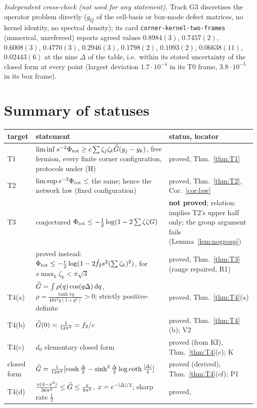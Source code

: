 \documentclass[11pt]{article}
\theoremstyle{definition}\newtheorem{hypothesis}[theorem]{Hypothesis}
\begin{document}
\emph{Independent cross-check (not used for any statement).}  Track G3 discretises the operator problem
directly ($g_Q$ of the cell-basis or box-mode defect matrices, no kernel identity, no spectral density); its
card \texttt{corner-kernel-two-frames} (numerical, unrefereed) reports agreed values $0.8984(3)$, $0.7457(2)$,
$0.6008(3)$, $0.4770(3)$, $0.2946(3)$, $0.1798(2)$, $0.1093(2)$, $0.06638(11)$, $0.02443(6)$ at the nine
$\Delta$ of the table, i.e.\ within its stated uncertainty of the closed form at every point (largest
deviation $1.7\cdot10^{-4}$ in its T0 frame, $3.8\cdot10^{-5}$ in its box frame).

\section{Summary of statuses}\label{sec:summary}
\begin{center}\small
\begin{tabular}{p{}p{}p{}}\toprule
target & statement & status, locator\\\midrule
T1 & $\liminf s^{-2}\Phi_{\rm tot}\ge c\sum\zeta_j\zeta_k\widehat G(y_j-y_k)$, free fermion, every finite corner
 configuration, protocols under (H) & proved, Thm.~\ref{thm:T1}\\
T2 & $\limsup s^{-2}\Phi_{\rm tot}\le$ the same; hence the network law (fixed configuration) & proved,
 Thm.~\ref{thm:T2}, Cor.~\ref{cor:law}\\
T3 & conjectured $\Phi_{\rm tot}\le-\frac12\log(1-2\sum\zeta\zeta G)$ & \textbf{not proved}; relation:
 implies T2's upper half only; the group argument fails (Lemma~\ref{lem:nogroup})\\
 & proved instead: $\Phi_{\rm tot}\le-\frac r2\log(1-2\hat f_2s^2(\sum\zeta_k)^2)$, for $s\max_k\zeta_k<\pi\sqrt3$ &
 proved, Thm.~\ref{thm:T3} (range repaired, R1)\\
T4(a) & $\widehat G=\int\rho(q)\cos(q\Delta)\,\mathrm d q$, $\rho=\frac{\tanh\pi q}{48\pi^2q(1+q^2)}>0$; strictly positive-definite &
 proved, Thm.~\ref{thm:T4}(a)\\
T4(b) & $\widehat G(0)=\frac1{12\pi^2}=f_2/c$ & proved, Thm.~\ref{thm:T4}(b); V2\\
T4(c) & $\hat d_0$ elementary closed form & proved (from KI), Thm.~\ref{thm:T4}(c); K\\
closed form & $\widehat G=\frac1{12\pi^2}[\cosh\frac\Delta2-\sinh^2\frac\Delta2\log\coth\frac{\lvert\Delta\rvert}4]$ & proved
 (derived), Thm.~\ref{thm:T4}(cf); P1\\
T4(d) & $\frac{x(4-x^2)}{36\pi^2}\le\widehat G\le\frac x{9\pi^2}$, $x=e^{-\lvert\Delta\rvert/2}$; sharp rate $\frac12$ & proved,

\end{tabular}
\end{center}
\end{document}
